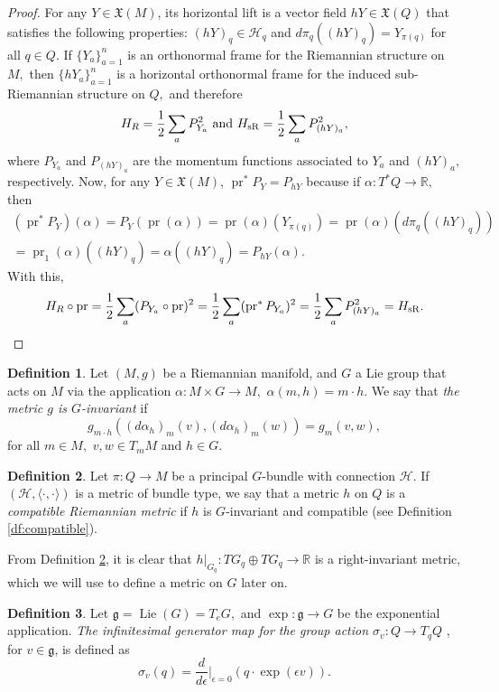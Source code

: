 \documentclass[12pt, letterpaper, reqno]{amsart}
\theoremstyle{definition}
\newtheorem{df}{Definition}
\theoremstyle{plain}
\theoremstyle{remark}
\providecommand{\DIFaddbegin}{} %
\providecommand{\DIFaddend}{} %
\newcommand{\DIFaddincludegraphics}[2][]{{\color{blue}\fbox{\DIFOincludegraphics[#1]{#2}}}} %
\DeclareRobustCommand{\DIFaddbegin}{\DIFOaddbegin \let\includegraphics\DIFaddincludegraphics} %
\DeclareRobustCommand{\DIFaddend}{\DIFOaddend \let\includegraphics\DIFOincludegraphics} %
\begin{document}
\begin{proof}
	For any $ Y \in \mathfrak{X}(M) $, its horizontal lift is a vector field $ hY \in \mathfrak{X}(Q) $ that satisfies the following properties: $ (hY)_q \in \mathcal{H}_q $ and $ d\pi_q( (hY)_q) = Y_{\pi(q)}$ for all $ q\in Q. $  If $\{Y_a\}_{a=1}^n $ is an orthonormal frame for the Riemannian structure on $ M, $ then $ \{hY_a\}_{a=1}^n $ is a horizontal orthonormal frame for the induced sub-Riemannian structure on $ Q, $ and therefore
	$$ H_R = \frac{1}{2} \sum^{}_{a} P_{Y_a}^2 \text{ and } H_{\DIFaddbegin \rm \DIFaddend sR} = \frac{1}{2} \sum^{}_{a} P_{(hY)_a}^2, $$ 
	where $ P_{Y_a} $ and $ P_{(hY)_a} $ are the momentum functions associated to $ Y_a $ and $ (hY)_a, $ respectively. Now, for any $ Y\in \mathfrak{X}(M) $, $ \operatorname{pr} ^* P_Y = P_{hY}$ because if $ \alpha: T^*Q \rightarrow \mathbb{R}, $ then
	\begin{align*}
	(\operatorname{pr}^*P_Y)(\alpha)=P_Y( \operatorname{pr} (\alpha)) = \operatorname{pr} (\alpha) (Y_{\pi(q)}) = \operatorname{pr} (\alpha) \left( d\pi_q((hY)_q) \right) \\= \operatorname{pr}_1(\alpha) \left( (hY)_q \right) =\alpha( (hY)_q ) =  P_{hY}(\alpha).  
	\end{align*}
	With this, 
	$$ H_R \circ \operatorname{pr} = \frac{1}{2} \sum^{}_{a} (P_{Y_a}\circ \operatorname{pr} )^2 = \frac{1}{2} \sum^{}_{a} (\operatorname{pr}^* P_{Y_a})^2 = \frac{1}{2} \sum^{}_{a} P_{(hY)_a}^2=H_{\DIFaddbegin \rm \DIFaddend sR}. $$ 
\end{proof}
\begin{df}
	Let $ (M,g) $ be a Riemannian manifold, and $G $ a Lie group that acts on $ M $ via the application $ \alpha: M\times G \rightarrow M, $ $ \alpha(m,h)= m\cdot h. $ We say that \textit{the metric $ g $ is $ G $-invariant} if  
	$$ g_{m\cdot h}((d\alpha_h)_m(v),(d\alpha_h)_m(w))=g_m(v,w), $$ 
	for all $ m\in M, $ $ v,w\in T_mM $ and $ h\in G. $ 
\end{df}

\begin{df}\label{df:compatible_riemannian_metric}
	Let $ \pi: Q \rightarrow M $ be a principal $ G $-bundle with connection $ \mathcal{H}. $ If $ (\mathcal{H},\langle\cdot,\cdot\rangle) $ is a metric of bundle type, we say that a metric $ h $ on $ Q $ is a \textit{compatible Riemannian metric} if $ h $ is $ G $-invariant and compatible (see Definition \ref{df:compatible}).
\end{df}
 From Definition \ref{df:compatible_riemannian_metric}, it is clear that $ h|_{G_q}: TG_q \oplus TG_q \rightarrow \mathbb{R} $ is a right-invariant metric, which we will use to define a metric on $ G $ later on.
 \begin{df}
Let $ \mathfrak{g}= \operatorname{Lie}(G)=T_eG, $ and $ \operatorname{exp} : \mathfrak{g}\rightarrow G $ be the exponential application. \textit{The infinitesimal generator map for the group action $ \sigma_v: Q\rightarrow T_qQ $ }, for $ v \in \mathfrak{g} $,  is defined as
$$ \sigma_v(q) = \frac{d}{d\epsilon} \Big|_{\epsilon=0} \left( q\cdot \operatorname{exp} (\epsilon v) \right).$$ 
 \end{df}
\end{document}
